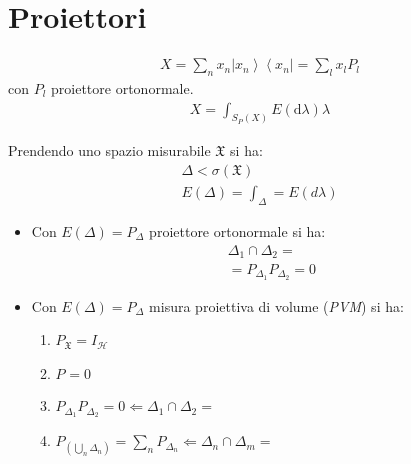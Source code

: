 \section{Proiettori} %
\begin{equation}\begin{split}
X=\sum_{n}x_n\left |x_n \right\rangle\left\langle x_n\right |=\sum_{l}x_lP_l
\end{split}\end{equation}
con $P_l$ proiettore ortonormale.
\begin{equation}\begin{split}
X=\int_{S_P\left(X\right)}{E\left(\textrm{d}\lambda\right)\lambda}
\end{split}\end{equation}

Prendendo uno spazio misurabile $\mathfrak{X}$ si ha:
\begin{equation}\begin{split}
\Delta < \sigma\left(\mathfrak{X}\right) \\
E\left(\Delta\right)=\int_{\Delta}=E\left(d\lambda\right)
\end{split}\end{equation}
\begin{itemize}
\item Con $E\left(\Delta\right)=P_\Delta$ proiettore ortonormale si ha:
\begin{equation}\begin{split}
\Delta_1\cap \Delta_2= \\
=P_{\Delta_1}P_{\Delta_2}=0
\end{split}\end{equation}
\item Con $E\left(\Delta\right)=P_\Delta$ misura proiettiva di volume (\emph{PVM}) si ha:
\begin{enumerate}
\item $P_{\mathfrak{X}}=I_{\mathcal{H}}$
\item $P_{}=0$
\item $P_{\Delta_1}P_{\Delta_2}=0 \Longleftarrow \Delta_1\cap\Delta_2=$
\item $P_{\left(\bigcup _n\Delta_n\right)}=\sum_n{P_{\Delta_n}} \Longleftarrow \Delta_n\cap\Delta_m=$
\end{enumerate}
\end{itemize}